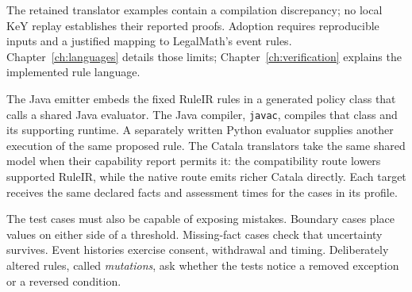The retained translator examples contain a compilation discrepancy; no local
KeY replay establishes their reported proofs. Adoption requires reproducible
inputs and a justified mapping to LegalMath's event rules.
Chapter~\ref{ch:languages} details those limits; Chapter~\ref{ch:verification}
explains the implemented rule language.

\clearpage
{}
The Java emitter embeds the fixed RuleIR rules in a generated policy class
that calls a shared Java evaluator. The Java compiler, \texttt{javac}, compiles
that class and its supporting runtime. A separately written Python evaluator
supplies another execution of the same proposed rule. The Catala translators
take the same shared model when their capability report permits it: the
compatibility route lowers supported RuleIR, while the native route emits richer
Catala directly. Each target receives the same declared facts and assessment
times for the cases in its profile.

\begin{MapDiagram}
\end{MapDiagram}

The test cases must also be capable of exposing mistakes. Boundary cases place
values on either side of a threshold. Missing-fact cases check that uncertainty
survives. Event histories exercise consent, withdrawal and timing. Deliberately
altered rules, called \emph{mutations}, ask whether the tests notice a removed
exception or a reversed condition.

